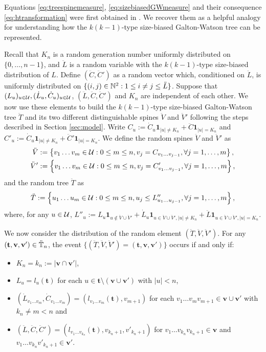 \documentclass[12pt]{amsart}
\numberwithin{equation}{section}
\newcommand{\ind}[1]{\mathbf 1_{#1}}
\newcommand{\abs}[1]{\left| #1 \right|}
\newcommand{\set}[1]{\left\{ #1 \right\}}
\newcommand{\tree}{\mathbf t}
\newcommand{\spine}{\mathbf v}
\begin{document}
\par
	Equations \eqref{eq:treespinemeasure}, \eqref{eq:sizebiasedGWmeasure} and their consequence \eqref{eq:htransformation} were first obtained in \cite{lyons1995conceptual}.
	We recover them as a helpful analogy for understanding how the $k(k-1)$-type size-biased Galton-Watson tree can be represented.
\par	
	Recall that $K_n$ is a random generation number uniformly distributed on
		$\{0,\dots,n-1\}$,
	and $\ddot L$ is a random variable with the $k(k-1)$-type size-biased distribution of $L$.
	Define $(\ddot C,\ddot C')$ as a random vector which, conditioned on $\ddot L$, is uniformly distributed on $\{(i,j)\in\mathbb N^2:1\leq i\neq j\leq \ddot L\}$.
	Suppose that $(L_u)_{u\in\mathcal U}, (\dot L_u,\dot C_u)_{u\in \mathcal U}$, $(\ddot L,\ddot C,\ddot C')$ and $K_n$ are independent of each other.
	We now use these elements to build the $k(k-1)$-type size-biased Galton-Watson tree $\ddot T$ and its two different distinguishable spines $\ddot V$ and $\ddot V'$ following the steps described in Section \ref{sec:model}.
	Write $C_u:=\dot C_u\ind{|u|\neq K_n}+\ddot C\ind{|u|=K_n}$ and $C'_u:=\dot C_u\ind{|u|\neq K_n}+\ddot C'\ind{|u|=K_n}$.
	We define the random spines $\ddot V$ and $\ddot V'$ as
\begin{align*}
        \ddot V
	&:=
				\set{v_1\dots v_m\in \cU:0\le m\le n, v_j= C_{v_1\dots v_{j-1}},\forall j=1,\dots,m},
	\\
		\ddot V'
	&:=
				\set{v_1\dots v_m\in \cU:0\le m \le n, v_j= C'_{v_1\dots v_{j-1}},\forall j=1,\dots,m},
\end{align*}
	and the random tree $\ddot T$ as
\begin{equation*}
	    \ddot T
	:=
		\set{u_1\dots u_m\in\cU: 0\le m\le n,u_j\leq L''_{u_1\dots u_{j-1}},\forall j=1,\dots,m},
\end{equation*}
	where, for any $u\in\mathcal U$, $L''_u:=L_u \ind{u\not\in \ddot V\cup\ddot V'}+\dot L_u \ind{u\in \ddot V\cup\ddot V',|u|\neq K_n}+\ddot L\ind{u\in \ddot V\cup\ddot V',|u|=K_n}$.
\par
	We now consider the distribution of the random element $(\ddot T,\ddot V,\ddot V')$. For any $(\tree,\spine,\spine')\in\ddot\bbT_n$, the event $\{(\ddot T,\ddot V,\ddot V')=(\tree,\spine,\spine')\}$ occurs if and only if:
\begin{itemize}
\item
    $K_n=k_n:=|\spine\cap\spine'|$,
\item
    $L_u=l_u(\tree)$ for each $u\in \tree\setminus(\spine\cup\spine')$ with $\abs{u}<n$,
\item
        $(\dot L_{v_1\dots v_m},\dot C_{v_1\dots v_m})=(l_{v_1\dots v_m}(\tree),v_{m+1})$ for each $v_1\dots v_mv_{m+1}\in\spine\cup\spine'$ with $k_n\neq m<n$ and
\item
        $(\ddot L,\ddot C,\ddot C')=(l_{v_1\dots v_{k_n}}(\tree),v_{k_n+1},v'_{k_n+1})$ for $v_1\dots v_{k_n}v_{k_n+1}\in\spine$ and $v_1\dots v_{k_n}v'_{k_n+1}\in\spine'$.
\end{itemize}
\end{document}
